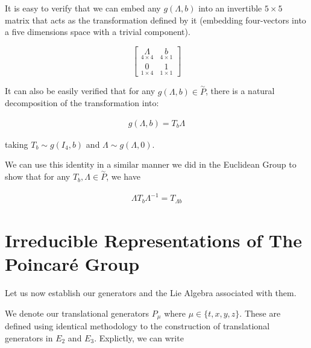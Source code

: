 \documentclass[10pt]{ucthesis}
\begin{document}
It is easy to verify that we can embed any $g(\Lambda,b)$ into an invertible $5\times 5$ matrix that acts as the transformation defined by it (embedding four-vectors into a five dimensions space with a trivial component).

$$\begin{bmatrix}
	\underset{4\times 4}{\Lambda} & \underset{4\times 1}{b}\\
	\underset{1\times 4}{0} & \underset{1\times 1}{1}
\end{bmatrix}$$

It can also be easily verified that for any $g(\Lambda,b)\in\overset{\sim}{P}$, there is a natural decomposition of the transformation into:

\begin{equation}
\begin{aligned}
g(\Lambda,b)=T_b\Lambda
 \end{aligned}
\end{equation}


\noindent taking $T_b \sim g(I_4,b)$ and $\Lambda \sim g(\Lambda,0)$.

We can use this identity in a similar manner we did in the Euclidean Group to show that for any $T_b,\Lambda\in\overset{\sim}{P}$, we have

\begin{equation}
\begin{aligned}
	\Lambda T_b \Lambda^{-1} = T_{\Lambda b}
\end{aligned}
\end{equation}

\section{Irreducible Representations of The Poincar\'e Group}

Let us now establish our generators and the Lie Algebra associated with them.

We denote our translational generators $P_\mu$ where $\mu\in\{t,x,y,z\}$. These are defined using identical methodology to the construction of translational generators in $E_2$ and $E_3$. Explictly, we can write 
\end{document}
